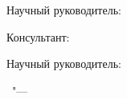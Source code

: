 %
\vspace{0pt plus4fill} %
\begin{flushright}
\ifdefined\supervisorTwoFio
Научный руководитель:


\ifdefined\supervisorDead
\framebox{\supervisorFio}
\else
\supervisorFio
\fi

Консультант:


\ifdefined\supervisorTwoDead
\framebox{\supervisorTwoFio}
\else
\supervisorTwoFio
\fi
\else
Научный руководитель:

\ifdefined\supervisorDead
\framebox{\supervisorFio}
\else
\supervisorFio
\fi
\fi


\end{flushright}
%
\vspace{0pt plus4fill} %
{\centering\thesisCity\ "--- \thesisYear\par}

